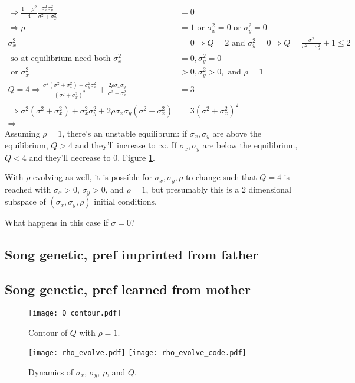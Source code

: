 \documentclass{article}
\begin{document}
\begin{landscape}
\begin{align*}
\\ \Rightarrow \frac{1-\rho^2}{4}\frac{\sigma_x^2\sigma_y^2}{\sigma^2+\sigma_x^2} & = 0
\\ \Rightarrow \rho&=1 \text{ or }  \sigma_x^2=0 \text{ or } \sigma_y^2=0
\\ \sigma_x^2&=0 \Rightarrow Q = 2 \text{ and } \sigma_y^2=0 \Rightarrow Q = \frac{\sigma^2}{\sigma^2+\sigma_x^2}+1\leq 2
\\ \text{ so at equilibrium need both } \sigma_x^2&=0,\sigma_y^2=0 
\\ \text{ or } \sigma_x^2&>0,\sigma_y^2>0, \text{ and } \rho=1
\\ Q = 4 \Rightarrow \frac{\sigma^2(\sigma^2+\sigma_x^2)+\sigma_y^2\sigma_x^2}{(\sigma^2+\sigma_x^2)^2}+\frac{2\rho\sigma_x\sigma_y}{\sigma^2+\sigma_x^2} & = 3
\\ \Rightarrow \sigma^2(\sigma^2+\sigma_x^2)+\sigma_x^2\sigma_y^2+2\rho\sigma_x\sigma_y(\sigma^2+\sigma_x^2) & = 3(\sigma^2+\sigma_x^2)^2
\\ \Rightarrow 
\end{align*}
Assuming $\rho=1$, there's an unstable equilibrum: if $\sigma_x,\sigma_y$ are  above the equilibrium, $Q>4$ and they'll increase to $\infty$. If $\sigma_x,\sigma_y$ are below the equilibrium, $Q<4$ and they'll decrease to $0$. Figure \ref{Q_contour}.

With $\rho$ evolving as well, it is possible for $\sigma_x,\sigma_y,\rho$ to change such that $Q=4$ is reached with $\sigma_x>0$, $\sigma_y>0$, and $\rho=1$, but presumably this is a $2$ dimensional subspace of $(\sigma_x,\sigma_y,\rho)$ initial conditions.


What happens in this case if $\sigma=0$?

\subsection{Song genetic, pref imprinted from father } 
\subsection{Song genetic, pref learned from mother }
\end{landscape} 

\begin{figure}
\texttt{[image: Q\_contour.pdf]}
\caption{\label{Q_contour} Contour of $Q$ with $\rho=1$.}
\end{figure}

\begin{figure}
\texttt{[image: rho\_evolve.pdf]}
\texttt{[image: rho\_evolve\_code.pdf]}
\caption{\label{rho_evolve} Dynamics of $\sigma_x$, $\sigma_y$, $\rho$, and $Q$. }
\end{figure}
\end{document}
